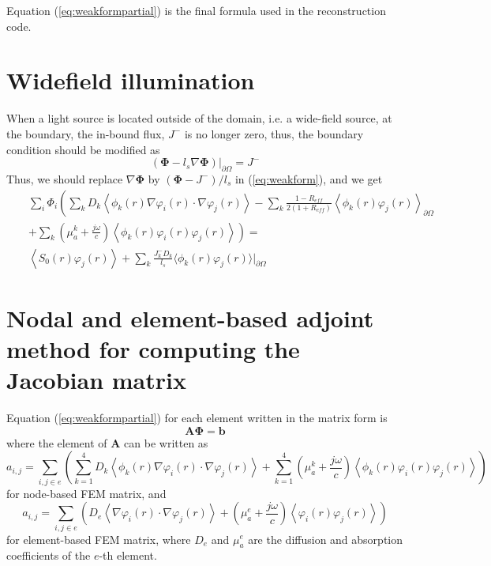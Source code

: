 \documentclass[12pt]{book}               %
\begin{document}
Equation (\ref{eq:weakformpartial}) is the final formula used in
the reconstruction code.

\section{Widefield illumination}
When a light source is located outside of the domain, i.e. a wide-field source, at the boundary, the 
in-bound flux, $J^-$ is no longer zero, thus, the boundary condition should be modified as
\begin{equation}
\label{eq:widefieldsrc} \left(\boldsymbol\Phi-l_s\nabla{\boldsymbol\Phi}\right)|_{\partial\Omega}=J^-
\end{equation}
Thus, we should replace $\nabla{\boldsymbol\Phi}$ by $(\boldsymbol\Phi - J^-)/l_s$ in (\ref{eq:weakform}), and we get
\begin{eqnarray}\nonumber
\label{eq:weakformwidefield}\nonumber&&\sum_{i}\Phi_i\left(\sum_{k}D_k\left\langle
\phi_k(r)\nabla\varphi_i(r)\cdot\nabla\varphi_j(r)\right\rangle -
\sum_{k}\frac{1-R_{eff}}{2(1+R_{eff})}\left\langle
\phi_k(r)\varphi_j(r)\right\rangle_{\partial\Omega}\right.
\\&&\left.+\sum_{k}\left(\mu_{a}^k+\frac{j\omega}{c}\right)\left\langle\phi_k(r)\varphi_i(r)\varphi_j(r)\right\rangle\right)=\\\nonumber
&& \left\langle S_0(r)\varphi_j(r)\right\rangle + \sum_k\frac{J^-_kD_k}{l_s}\langle\phi_k(r)\varphi_j(r)\rangle|_{\partial\Omega}
\end{eqnarray}

\section{Nodal and element-based adjoint method for computing the Jacobian matrix}
Equation (\ref{eq:weakformpartial}) for each element written in the
matrix form is
\begin{equation}
\label{eq:matrix} \mathbf{A}{\boldsymbol\Phi}=\mathbf{b}
\end{equation}
where the element of $\mathbf{A}$ can be written as
\begin{equation}
a_{i,j}=\sum_{i,j\in e}\left(\sum_{k=1}^4D_k\left\langle
\phi_k(r)\nabla\varphi_i(r)\cdot\nabla\varphi_j(r)\right\rangle+\sum_{k=1}^4\left(\mu_{a}^k+\frac{j\omega}{c}\right)\left\langle\phi_k(r)\varphi_i(r)\varphi_j(r)\right\rangle\right)
\end{equation}
for node-based FEM matrix, and 
\begin{equation}
a_{i,j}=\sum_{i,j\in e}\left(D_e\left\langle
\nabla\varphi_i(r)\cdot\nabla\varphi_j(r)\right\rangle+\left(\mu_{a}^{e}+\frac{j\omega}{c}\right)\left\langle\varphi_i(r)\varphi_j(r)\right\rangle\right)
\end{equation}
for element-based FEM matrix, where $D_e$ and $\mu_a^{e}$ are the diffusion and absorption coefficients 
of the $e$-th element.
\end{document}
